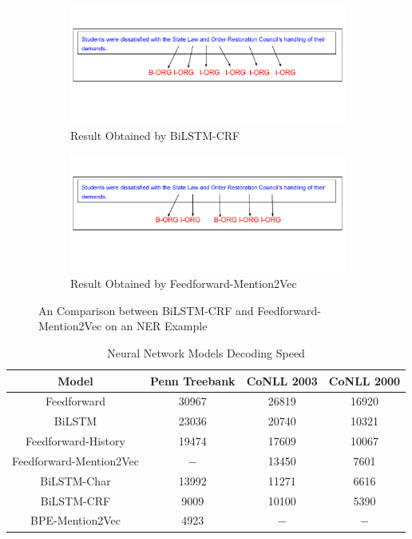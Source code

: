 \begin{figure}
\centering
\begin{subfigure}{\linewidth}
\includegraphics[width=1.0\linewidth]{NERbilstm2.pdf}
\vspace{-2.5cm}
\caption{Result Obtained by BiLSTM-CRF}
\end{subfigure}\par\medskip
\begin{subfigure}{\linewidth}
\vspace{-1cm}
\includegraphics[width=1.0\linewidth]{NERmen.pdf}
\vspace{-2.5cm}
\caption{Result Obtained by Feedforward-Mention2Vec}
\end{subfigure}
\caption{An Comparison between BiLSTM-CRF and Feedforward-Mention2Vec on an NER Example}
\label{fig:comp2}
\end{figure}


\begin{table}[h]
\centering
\caption{Neural Network Models Decoding Speed}
\label{table:my-label2}
\begin{tabular}{|c|c|c|c|}
\hline
Model & Penn Treebank & CoNLL 2003 & CoNLL 2000\\ \hline
Feedforward    & 30967    & 26819   & 16920 \\ \hline
BiLSTM              & 23036    & 20740  & 10321    \\ \hline
Feedforward-History & 19474    & 17609  & 10067   \\
\hline
Feedforward-Mention2Vec     & $-$      & 13450 & 7601 \\ \hline
BiLSTM-Char         & 13992    & 11271  & 6616         \\ \hline
BiLSTM-CRF     & 9009     & 10100  & 5390     \\ \hline
BPE-Mention2Vec     & 4923  &  $-$  & $-$       \\ \hline   
\end{tabular}
\end{table}

